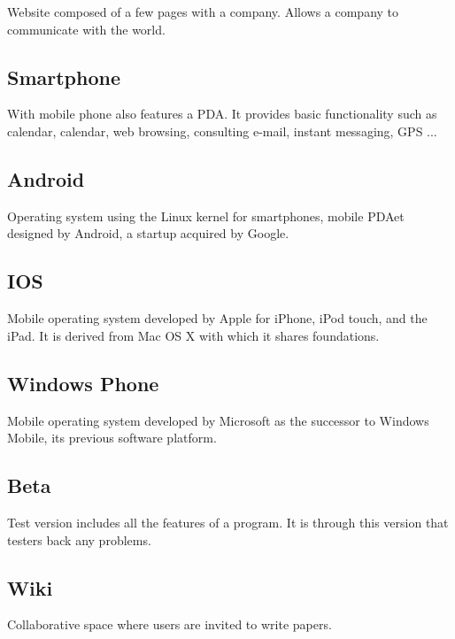 \documentclass{life-fr}
\begin{document}
Website composed of a few pages with a company. Allows a company to communicate with the world.

\subsection {Smartphone}

With mobile phone also features a PDA. It provides basic functionality such as calendar, calendar, web browsing, consulting e-mail, instant messaging, GPS ...

\subsection {Android}

Operating system using the Linux kernel for smartphones, mobile PDAet designed by Android, a startup acquired by Google.

\subsection {IOS}

Mobile operating system developed by Apple for iPhone, iPod touch, and the iPad. It is derived from Mac OS X with which it shares foundations.

\subsection {Windows Phone}

Mobile operating system developed by Microsoft as the successor to Windows Mobile, its previous software platform.

\subsection {Beta}

Test version includes all the features of a program. It is through this version that testers back any problems.

\subsection {Wiki}

Collaborative space where users are invited to write papers.

\newpage
\hspace{2cm}
\newpage
\end{document}
